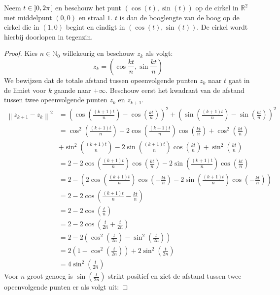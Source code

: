 \documentclass[main.tex]{subfiles}
\begin{document}
\begin{bpr}
  Neem $t\in \interval[open]{0}{2\pi}$ en beschouw het punt $(\cos(t),\sin(t))$ op de cirkel in $\mathbb{R}^{2}$ met middelpunt $(0,0)$ en straal $1$.
  $t$ is dan de booglengte van de boog op de cirkel die in $(1,0)$ begint en eindigt in $(\cos(t),\sin(t))$.
  De cirkel wordt hierbij doorlopen in tegenzin.

  \begin{proof}
    Kies $n\in \mathbb{N}_{0}$ willekeurig en beschouw $z_{k}$ als volgt:
    \[ z_{k} = \left(\cos\frac{kt}{n},\sin\frac{kt}{n}\right) \]
    We bewijzen dat de totale afstand tussen opeenvolgende punten $z_{k}$ naar $t$ gaat in de limiet voor $k$ gaande naar $+\infty$.
    Beschouw eerst het kwadraat van de afstand tussen twee opeenvolgende punten $z_{k}$ en $z_{k+1}$.
    \begin{align*}
      \left\|z_{k+1}-z_{k}\right\|^{2}
      &= \left( \cos\left(\frac{(k+1)t}{n}\right) - \cos\left(\frac{kt}{n}\right) \right)^{2}
       + \left( \sin\left(\frac{(k+1)t}{n}\right) - \sin\left(\frac{kt}{n}\right) \right)^{2}\\
      &= \cos^{2}\left(\frac{(k+1)t}{n}\right) - 2\cos\left(\frac{(k+1)t}{n}\right)\cos\left(\frac{kt}{n}\right) + \cos^{2}\left(\frac{kt}{n}\right)\\
      &+ \sin^{2}\left(\frac{(k+1)t}{n}\right) - 2\sin\left(\frac{(k+1)t}{n}\right)\cos\left(\frac{kt}{n}\right) + \sin^{2}\left(\frac{kt}{n}\right)\\
      &= 2 - 2\cos\left(\frac{(k+1)t}{n}\right)\cos\left(\frac{kt}{n}\right) - 2\sin\left(\frac{(k+1)t}{n}\right)\cos\left(\frac{kt}{n}\right)\\
      &= 2 - \left(2\cos\left(\frac{(k+1)t}{n}\right)\cos\left(-\frac{kt}{n}\right) - 2\sin\left(\frac{(k+1)t}{n}\right)\cos\left(-\frac{kt}{n}\right)\right)\\
      &= 2-2\cos\left( \frac{(k+1)t}{n} - \frac{kt}{n}\right)\\
      &= 2-2\cos\left(\frac{t}{n}\right)\\
      &= 2-2\cos\left(\frac{t}{2n}+ \frac{t}{2n}\right)\\
      &= 2-2\left(\cos^{2}\left(\frac{t}{2n}\right)-\sin^{2}\left(\frac{t}{2n}\right)\right)\\
      &= 2\left(1-\cos^{2}\left(\frac{t}{2n}\right)\right) + 2\sin^{2}\left(\frac{t}{2n}\right)\\
      &= 4\sin^{2}\left(\frac{t}{2n}\right)
    \end{align*}
    Voor $n$ groot genoeg is $\sin\left(\frac{t}{2n}\right)$ strikt positief en ziet de afstand tussen twee opeenvolgende punten er als volgt uit:

\end{proof}
\end{bpr}
\end{document}
